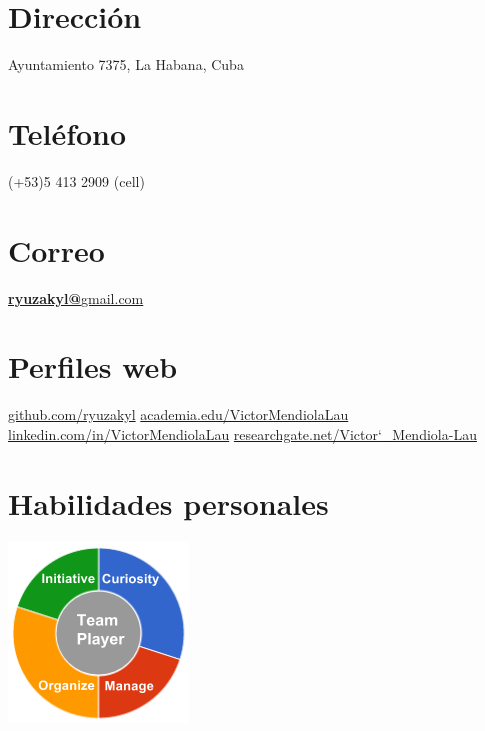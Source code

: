 \documentclass[]{friggeri-cv}
\begin{document}
      

\begin{aside}
  \section{Dirección}
    Ayuntamiento 7375, 
    La Habana, Cuba
    ~
    ~
    ~
  \section{Teléfono}
    (+53)5 413 2909 (cell)
    ~
    ~
    ~
  \section{Correo}
    \href{mailto:ryuzakyl@gmail.com}{\textbf{ryuzakyl@}gmail.com}
	~
	~    
    ~
  \section{Perfiles web}
    \href{https://github.com/ryuzakyl}{{\scriptsize github.com/ryuzakyl}}
    \href{https://independent.academia.edu/VictorMendiolaLau}{{\scriptsize academia.edu/VictorMendiolaLau}}
    \href{https://www.linkedin.com/in/VictorMendiolaLau}{{\scriptsize linkedin.com/in/VictorMendiolaLau}}
	\href{https://www.researchgate.net/profile/Victor_Mendiola-Lau}{{\scriptsize researchgate.net/Victor\char`_Mendiola-Lau}}
    ~
    ~
    ~
  \section{Habilidades personales}
    \includegraphics[scale=0.62]{img/personal.png}
    ~
\end{aside}
\end{document}
